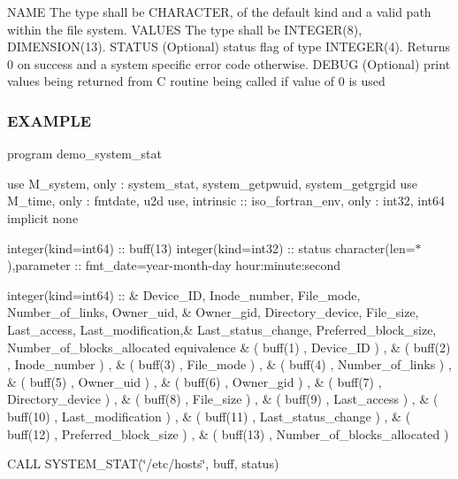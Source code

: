 \begin{DoxyVerb}NAME    The type shall be CHARACTER, of the default kind and a valid
        path within the file system.
VALUES  The type shall be INTEGER(8), DIMENSION(13).
STATUS  (Optional) status flag of type INTEGER(4). Returns 0 on success
        and a system specific error code otherwise.
DEBUG   (Optional) print values being returned from C routine being
        called if value of 0 is used
\end{DoxyVerb}


\subsubsection*{E\+X\+A\+M\+P\+LE}

program demo\+\_\+system\+\_\+stat

use M\+\_\+system, only \+: system\+\_\+stat, system\+\_\+getpwuid, system\+\_\+getgrgid use M\+\_\+time, only \+: fmtdate, u2d use, intrinsic \+:\+: iso\+\_\+fortran\+\_\+env, only \+: int32, int64 implicit none

integer(kind=int64) \+:\+: buff(13) integer(kind=int32) \+:\+: status character(len=$\ast$),parameter \+:\+: fmt\+\_\+date=\textquotesingle{}year-\/month-\/day hour\+:minute\+:second\textquotesingle{}

integer(kind=int64) \+:\+: \& Device\+\_\+\+ID, Inode\+\_\+number, File\+\_\+mode, Number\+\_\+of\+\_\+links, Owner\+\_\+uid, \& Owner\+\_\+gid, Directory\+\_\+device, File\+\_\+size, Last\+\_\+access, Last\+\_\+modification,\& Last\+\_\+status\+\_\+change, Preferred\+\_\+block\+\_\+size, Number\+\_\+of\+\_\+blocks\+\_\+allocated equivalence \& ( buff(1) , Device\+\_\+\+ID ) , \& ( buff(2) , Inode\+\_\+number ) , \& ( buff(3) , File\+\_\+mode ) , \& ( buff(4) , Number\+\_\+of\+\_\+links ) , \& ( buff(5) , Owner\+\_\+uid ) , \& ( buff(6) , Owner\+\_\+gid ) , \& ( buff(7) , Directory\+\_\+device ) , \& ( buff(8) , File\+\_\+size ) , \& ( buff(9) , Last\+\_\+access ) , \& ( buff(10) , Last\+\_\+modification ) , \& ( buff(11) , Last\+\_\+status\+\_\+change ) , \& ( buff(12) , Preferred\+\_\+block\+\_\+size ) , \& ( buff(13) , Number\+\_\+of\+\_\+blocks\+\_\+allocated )

C\+A\+LL S\+Y\+S\+T\+E\+M\+\_\+\+S\+T\+AT(\char`\"{}/etc/hosts\char`\"{}, buff, status)

